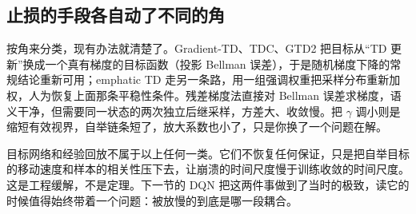 \subsection{止损的手段各自动了不同的角}

按角来分类，现有办法就清楚了。Gradient-TD、TDC、GTD2 把目标从``TD 更新''换成一个真有梯度的目标函数（投影 Bellman 误差），于是随机梯度下降的常规结论重新可用；emphatic TD 走另一条路，用一组强调权重把采样分布重新加权，人为恢复上面那条平稳性条件。残差梯度法直接对 Bellman 误差求梯度，语义干净，但需要同一状态的两次独立后继采样，方差大、收敛慢。把 \(\gamma\) 调小则是缩短有效视界，自举链条短了，放大系数也小了，只是你换了一个问题在解。

目标网络和经验回放不属于以上任何一类。它们不恢复任何保证，只是把自举目标的移动速度和样本的相关性压下去，让崩溃的时间尺度慢于训练收敛的时间尺度。这是工程缓解，不是定理。下一节的 DQN 把这两件事做到了当时的极致，读它的时候值得始终带着一个问题：被放慢的到底是哪一段耦合。
